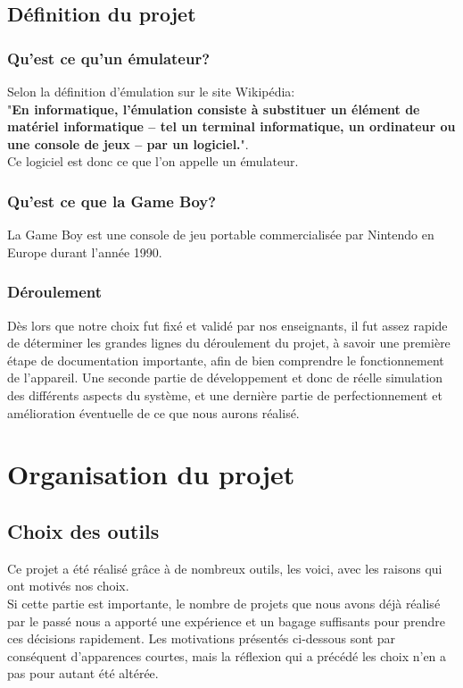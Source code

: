 \documentclass[french]{report}
\begin{document}
\section*{Définition du projet}
\subsection*{Qu'est ce qu'un émulateur?}
	Selon la définition d'émulation sur le site Wikipédia:\\"\textbf{En informatique, l'émulation consiste à substituer un élément de matériel informatique – tel un terminal informatique, un ordinateur ou une console de jeux – par un logiciel.}".\\Ce logiciel est donc ce que l'on appelle un émulateur.
\subsection*{Qu'est ce que la Game Boy?}
	La Game Boy est une console de jeu portable commercialisée par Nintendo en Europe durant l'année 1990.
\subsection*{Déroulement}
	Dès lors que notre choix fut fixé et validé par nos enseignants, il
	fut assez rapide de déterminer les grandes lignes du déroulement du
	projet, à savoir une première étape de documentation importante, afin
	de bien comprendre le fonctionnement de l'appareil. Une seconde partie
	de développement et donc de réelle simulation des différents aspects
	du système, et une dernière partie de perfectionnement et
	amélioration éventuelle de ce que nous aurons réalisé.

\chapter{Organisation du projet}
\section{Choix des outils}
Ce projet a été réalisé grâce à de nombreux outils, les voici, avec les raisons qui ont motivés nos choix.\\
Si cette partie est importante, le nombre de projets que nous avons déjà réalisé par le passé nous a apporté une expérience et un bagage suffisants pour prendre ces décisions rapidement. Les motivations présentés ci-dessous sont par conséquent d'apparences courtes, mais la réflexion qui a précédé les choix n'en a pas pour autant été altérée.
\end{document}
